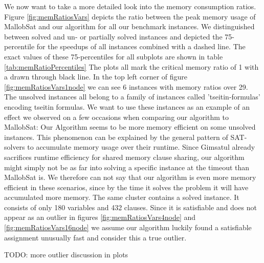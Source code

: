 \documentclass[12pt,a4paper,twoside]{scrartcl}
\numberwithin{equation}{section}
\begin{document}
\label{sec:peakMemRatios}
We now want to take a more detailed look into the memory consumption ratios. Figure \ref{fig:memRatiosVars} depicts the ratio between the peak memory usage of MallobSat and our algorithm for all our benchmark instances. We distinguished between solved and un- or partially solved instances and depicted the 75-percentile for the speedups of all instances combined with a dashed line. The exact values of these 75-percentiles for all subplots are shown in table \ref{tab:memRatioPercentiles} The plots all mark the critical memory ratio of 1 with a drawn through black line.
In the top left corner of figure \ref{fig:memRatiosVars1node} we can see 6 instances with memory ratios over 29. The unsolved instances all belong to a family of instances called 'tseitin-formulas' encoding tseitin formulas. We want to use these instances as an example of an effect we observed on a few occasions when comparing our algorithm to MallobSat: Our Algorithm seems to be more memory efficient on some unsolved instances. This phenomenon can be explained by the general pattern of SAT-solvers to accumulate memory usage over their runtime. Since Gimsatul already sacrifices runtime efficiency for shared memory clause sharing, our algorithm might simply not be as far into solving a specific instance at the timeout than MallobSat is. We therefore can not say that our algorithm is even more memory efficient in these scenarios, since by the time it solves the problem it will have accumulated more memory.
The same cluster contains a solved instance. It consists of only 180 variables and 432 clauses. Since it is satisfiable and does not appear as an outlier in figures \ref{fig:memRatiosVars4node} and \ref{fig:memRatiosVars16node} we assume our algorithm luckily found a satisfiable assignment unusually fast and consider this a true outlier.

TODO: more outlier discussion in plots
\end{document}
